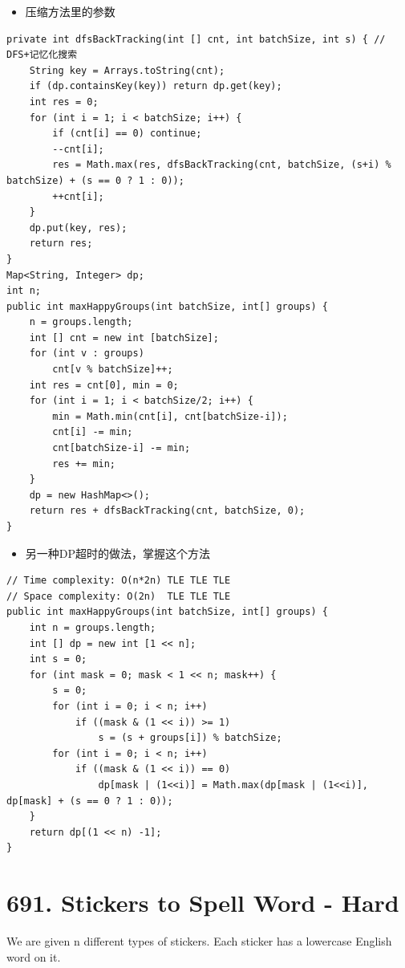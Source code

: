 \documentclass[9pt, b5paaper]{book}
\begin{document}
\begin{itemize}
\item 压缩方法里的参数
\end{itemize}
\begin{verbatim}
private int dfsBackTracking(int [] cnt, int batchSize, int s) { // DFS+记忆化搜索
    String key = Arrays.toString(cnt); 
    if (dp.containsKey(key)) return dp.get(key);
    int res = 0;
    for (int i = 1; i < batchSize; i++) {
        if (cnt[i] == 0) continue;
        --cnt[i]; 
        res = Math.max(res, dfsBackTracking(cnt, batchSize, (s+i) % batchSize) + (s == 0 ? 1 : 0));
        ++cnt[i]; 
    }
    dp.put(key, res);
    return res;
}
Map<String, Integer> dp;
int n;
public int maxHappyGroups(int batchSize, int[] groups) { 
    n = groups.length;
    int [] cnt = new int [batchSize];
    for (int v : groups) 
        cnt[v % batchSize]++;
    int res = cnt[0], min = 0;
    for (int i = 1; i < batchSize/2; i++) {
        min = Math.min(cnt[i], cnt[batchSize-i]);
        cnt[i] -= min;
        cnt[batchSize-i] -= min;
        res += min;
    }
    dp = new HashMap<>();
    return res + dfsBackTracking(cnt, batchSize, 0);
}
\end{verbatim}
\begin{itemize}
\item 另一种DP超时的做法，掌握这个方法
\end{itemize}
\begin{verbatim}
// Time complexity: O(n*2n) TLE TLE TLE
// Space complexity: O(2n)  TLE TLE TLE
public int maxHappyGroups(int batchSize, int[] groups) {
    int n = groups.length;
    int [] dp = new int [1 << n];
    int s = 0;
    for (int mask = 0; mask < 1 << n; mask++) { 
        s = 0;
        for (int i = 0; i < n; i++) 
            if ((mask & (1 << i)) >= 1)
                s = (s + groups[i]) % batchSize;
        for (int i = 0; i < n; i++) 
            if ((mask & (1 << i)) == 0)
                dp[mask | (1<<i)] = Math.max(dp[mask | (1<<i)], dp[mask] + (s == 0 ? 1 : 0));
    }            
    return dp[(1 << n) -1];
}
\end{verbatim}

\section{691. Stickers to Spell Word - Hard}
\label{sec-11-5}
We are given n different types of stickers. Each sticker has a lowercase English word on it.
\end{document}
